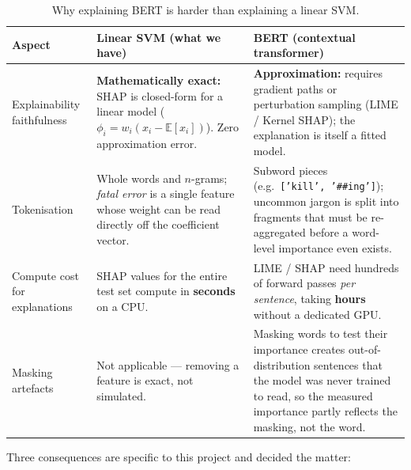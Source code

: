\documentclass[11pt,a4paper]{article}
\begin{document}
\begin{table}[H]
\centering
\caption{Why explaining BERT is harder than explaining a linear SVM.}
\label{tab:bertcompare}
\footnotesize
\renewcommand{\arraystretch}{1.35}
\begin{tabularx}{\textwidth}{>{\raggedright\arraybackslash}p{2.6cm} X X}
\toprule
\textbf{Aspect} & \textbf{Linear SVM (what we have)} & \textbf{BERT (contextual transformer)} \\
\midrule
Explainability faithfulness
& \textbf{Mathematically exact:} SHAP is closed-form for a linear model
  ($\phi_i = w_i(x_i - \mathbb{E}[x_i])$). Zero approximation error.
& \textbf{Approximation:} requires gradient paths or perturbation sampling
  (LIME / Kernel SHAP); the explanation is itself a fitted model. \\

Tokenisation
& Whole words and $n$-grams; \textit{fatal error} is a single feature whose
  weight can be read directly off the coefficient vector.
& Subword pieces (e.g.\ \texttt{['kill', '\#\#ing']}); uncommon jargon is split
  into fragments that must be re-aggregated before a word-level importance
  even exists. \\

Compute cost for explanations
& SHAP values for the entire test set compute in \textbf{seconds} on a CPU.
& LIME / SHAP need hundreds of forward passes \textit{per sentence}, taking
  \textbf{hours} without a dedicated GPU. \\

Masking artefacts
& Not applicable --- removing a feature is exact, not simulated.
& Masking words to test their importance creates out-of-distribution
  sentences that the model was never trained to read, so the measured
  importance partly reflects the masking, not the word. \\
\bottomrule
\end{tabularx}
\end{table}

Three consequences are specific to this project and decided the matter:
\end{document}
